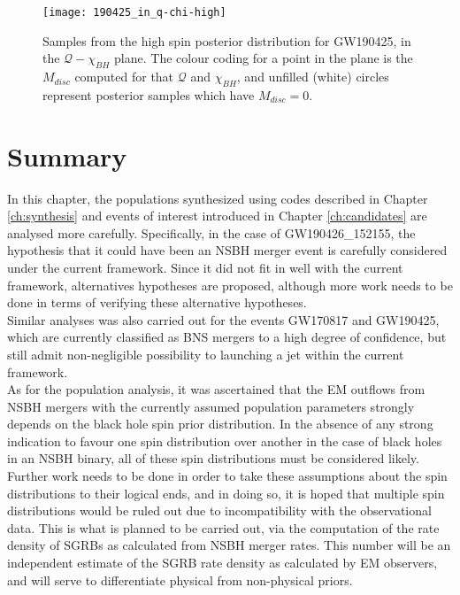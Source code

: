         \begin{figure}[ht]
            \centering
            \texttt{[image: 190425\_in\_q-chi-high]}
            \caption[$M_{disc}$ for GW190425's High Spin Posterior Distribution]
            {
                Samples from the high spin posterior distribution for GW190425, in the
                $\mathcal{Q}-\chi_{BH}$ plane. The colour coding for a point in the
                plane is the $M_{disc}$ computed for that $\mathcal{Q}$ and $\chi_{BH}$,
                and unfilled (white) circles represent posterior samples which have
                $M_{disc} = 0$.
            }
            \label{fig:190425_high}
        \end{figure}

\section{Summary}

    In this chapter, the populations synthesized using codes described in Chapter
    \ref{ch:synthesis} and events of interest introduced in Chapter \ref{ch:candidates}
    are analysed more carefully. Specifically, in the case of GW190426\_152155, the
    hypothesis that it could have been an NSBH merger event is carefully considered
    under the current framework. Since it did not fit in well with the current
    framework, alternatives hypotheses are proposed, although more work needs to be done
    in terms of verifying these alternative hypotheses.\\
    Similar analyses was also carried out for the events GW170817 and GW190425, which
    are currently classified as BNS mergers to a high degree of confidence, but still
    admit non-negligible possibility to launching a jet within the current framework.\\
    As for the population analysis, it was ascertained that the EM outflows from NSBH
    mergers with the currently assumed population parameters strongly depends on the
    black hole spin prior distribution. In the absence of any strong indication to
    favour one spin distribution over another in the case of black holes in an NSBH
    binary, all of these spin distributions must be considered likely. Further work
    needs to be done in order to take these assumptions about the spin distributions to
    their logical ends, and in doing so, it is hoped that multiple spin distributions
    would be ruled out due to incompatibility with the observational data. This is what
    is planned to be carried out, via the computation of the rate density of SGRBs as
    calculated from NSBH merger rates. This number will be an independent estimate of
    the SGRB rate density as calculated by EM observers, and will serve to differentiate
    physical from non-physical priors.
